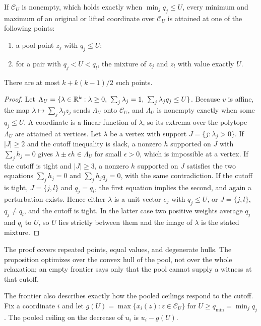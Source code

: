 \begin{proposition}\label{prop:frontier}
If $\mathcal C_U$ is nonempty, which holds exactly when $\min_jq_j\le U$,
every minimum and maximum of an original or lifted coordinate over
$\mathcal C_U$ is attained at one of the following points:
\begin{enumerate}[label=(\alph*)]
\item a pool point $z_j$ with $q_j\le U$;
\item for a pair with $q_j<U<q_l$, the mixture of $z_j$ and $z_l$ with
  value exactly $U$.
\end{enumerate}
There are at most $k+k(k-1)/2$ such points.
\end{proposition}
\begin{proof}
Let $\Lambda_U=\{\lambda\in\R^k:\lambda\ge0,\ \sum_j\lambda_j=1,\
\sum_j\lambda_jq_j\le U\}$. Because $v$ is affine, the map
$\lambda\mapsto\sum_j\lambda_jz_j$ sends $\Lambda_U$ onto $\mathcal C_U$,
and $\Lambda_U$ is nonempty exactly when some $q_j\le U$. A coordinate is
a linear function of $\lambda$, so its extrema over the polytope
$\Lambda_U$ are attained at vertices. Let $\lambda$ be a vertex with
support $J=\{j:\lambda_j>0\}$. If $|J|\ge2$ and the cutoff inequality is
slack, a nonzero $h$ supported on $J$ with $\sum_jh_j=0$ gives
$\lambda\pm\epsilon h\in\Lambda_U$ for small $\epsilon>0$, which is
impossible at a vertex. If the cutoff is tight and $|J|\ge3$, a nonzero
$h$ supported on $J$ satisfies the two equations $\sum_jh_j=0$ and
$\sum_jh_jq_j=0$, with the same contradiction. If the cutoff is tight,
$J=\{j,l\}$ and $q_j=q_l$, the first equation implies the second, and
again a perturbation exists. Hence either $\lambda$ is a unit vector
$e_j$ with $q_j\le U$, or $J=\{j,l\}$, $q_j\ne q_l$, and the cutoff is
tight. In the latter case two positive weights average $q_j$ and $q_l$ to
$U$, so $U$ lies strictly between them and the image of $\lambda$ is the
stated mixture.
\end{proof}

The proof covers repeated points, equal values, and degenerate hulls. The
proposition optimizes over the convex hull of the pool, not over the
whole relaxation; an empty frontier says only that the pool cannot
supply a witness at that cutoff.

The frontier also describes exactly how the pooled ceilings respond to
the cutoff. Fix a coordinate $i$ and let
$g(U)=\max\{x_i(z):z\in\mathcal C_U\}$ for $U\ge q_{\min}=\min_jq_j$.
The pooled ceiling on the decrease of $u_i$ is $u_i-g(U)$.

